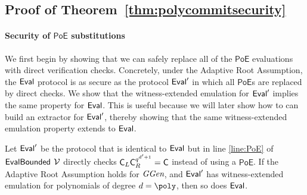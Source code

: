 \subsection{Proof of Theorem~\ref{thm:polycommitsecurity}}
\label{appendix:maintheoremproof}

\paragraph{Security of $\textsf{PoE}$ substitutions}
We first begin by showing that we can safely replace all of the $\textsf{PoE}$ evaluations with direct verification checks. Concretely, under the Adaptive Root Assumption, the $\textsf{{Eval}}$ protocol is as secure as the protocol $\textsf{{Eval}}'$ in which all $\textsf{PoE}$s are replaced by direct checks. We show that the witness-extended emulation for $\textsf{{Eval}}'$ implies the same property for $\textsf{{Eval}}$. This is useful because we will later show how to can build an extractor for $\textsf{{Eval}}'$, thereby showing that the same witness-extended emulation property extends to $\textsf{{Eval}}$.

\begin{lemma} \label{lemma:poe_security}
Let $\textsf{{Eval}}'$ be the protocol that is identical to $\textsf{{Eval}}$ but in line \ref{line:PoE} of $\textsf{{EvalBounded}}$ $\mathcal{V}$ directly checks $\mathsf{C}_L\mathsf{C}_R^{q^{d'+1}}=\mathsf{C}$ instead of using a $\textsf{PoE}$. If the Adaptive Root Assumption holds for $\textit{GGen}$, and $\textsf{{Eval}}'$ has witness-extended emulation for polynomials of degree $d=\poly$, then so does $\textsf{{Eval}}$.
\end{lemma}

